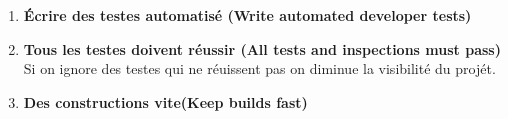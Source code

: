 \begin{enumerate}
\item\textbf{Écrire des testes automatisé (Write automated developer tests)}

\item\textbf{Tous les testes doivent réussir (All tests and inspections must pass)}\\
Si on ignore des testes qui ne réuissent pas on diminue la visibilité du projét.

\item\textbf{Des constructions vite(Keep builds fast)}\\

\end{enumerate}



